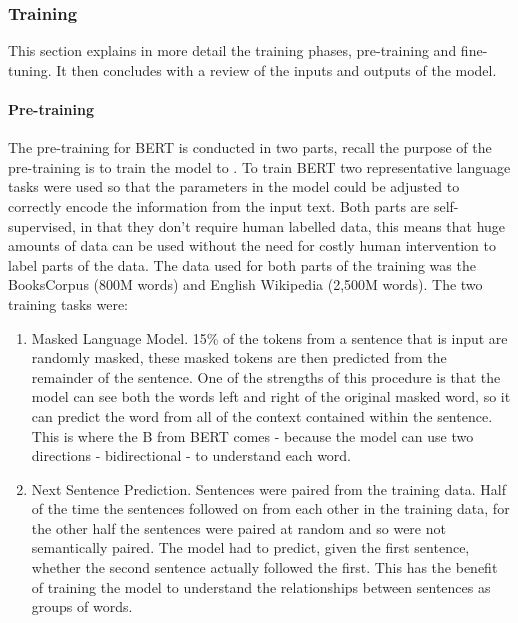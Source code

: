 \subsubsection{Training} This section explains in more detail the training phases, pre-training and fine-tuning. It then concludes with a review of the inputs and outputs of the model.

\paragraph{Pre-training} The pre-training for BERT is conducted in two parts, recall the purpose of the pre-training is to train the model to . To train BERT two representative language tasks were used so that the parameters in the model could be adjusted to correctly encode the information from the input text. Both parts are self-supervised, in that they don't require human labelled data, this means that huge amounts of data can be used without the need for costly human intervention to label parts of the data. The data used for both parts of the training was the BooksCorpus (800M words) and English Wikipedia (2,500M words). The two training tasks were:

\begin{enumerate}
    \item Masked Language Model. 15\% of the tokens from a sentence that is input are randomly masked, these masked tokens are then predicted from the remainder of the sentence. One of the strengths of this procedure is that the model can see both the words left and right of the original masked word, so it can predict the word from all of the context contained within the sentence. This is where the B from BERT comes - because the model can use two directions - bidirectional - to understand each word. 
    
    \item Next Sentence Prediction. Sentences were paired from the training data. Half of the time the sentences followed on from each other in the training data, for the other half the sentences were paired at random and so were not semantically paired.  The model had to predict, given the first sentence, whether the second sentence actually followed the first. This has the benefit of training the model to understand the relationships between sentences as groups of words.
    
\end{enumerate}

